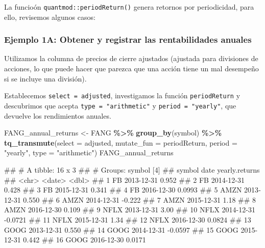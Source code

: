 \documentclass[
]{book}
\newenvironment{Shaded}{\begin{snugshade}}{\end{snugshade}}
\newcommand{\AttributeTok}[1]{\textcolor[rgb]{0.13,0.29,0.53}{#1}}
\newcommand{\FunctionTok}[1]{\textcolor[rgb]{0.13,0.29,0.53}{\textbf{#1}}}
\newcommand{\NormalTok}[1]{#1}
\newcommand{\OtherTok}[1]{\textcolor[rgb]{0.56,0.35,0.01}{#1}}
\newcommand{\SpecialCharTok}[1]{\textcolor[rgb]{0.81,0.36,0.00}{\textbf{#1}}}
\newcommand{\StringTok}[1]{\textcolor[rgb]{0.31,0.60,0.02}{#1}}
\begin{document}
La funcioón \texttt{quantmod::periodReturn()} genera retornos por periodicidad, para ello, revisemos algunos casos:

\hypertarget{ejemplo-1a-obtener-y-registrar-las-rentabilidades-anuales}{%
\subsubsection{Ejemplo 1A: Obtener y registrar las rentabilidades anuales}\label{ejemplo-1a-obtener-y-registrar-las-rentabilidades-anuales}}

Utilizamos la columna de precios de cierre ajustados (ajustada para divisiones de acciones, lo que puede hacer que parezca que una acción tiene un mal desempeño si se incluye una división).

Establecemos \texttt{select\ =\ adjusted}, investigamos la función \texttt{periodReturn} y descubrimos que acepta \texttt{type\ =\ "arithmetic"} y \texttt{period\ =\ "yearly"}, que devuelve los rendimientos anuales.

\begin{Shaded}
\begin{Highlighting}[]
\NormalTok{FANG\_annual\_returns }\OtherTok{\textless{}{-}}\NormalTok{ FANG }\SpecialCharTok{\%\textgreater{}\%}
    \FunctionTok{group\_by}\NormalTok{(symbol) }\SpecialCharTok{\%\textgreater{}\%}
    \FunctionTok{tq\_transmute}\NormalTok{(}\AttributeTok{select     =}\NormalTok{ adjusted, }
                 \AttributeTok{mutate\_fun =}\NormalTok{ periodReturn, }
                 \AttributeTok{period     =} \StringTok{"yearly"}\NormalTok{, }
                 \AttributeTok{type       =} \StringTok{"arithmetic"}\NormalTok{)}
\NormalTok{FANG\_annual\_returns}
\end{Highlighting}
\end{Shaded}

\begin{Shaded}
\begin{Highlighting}[]
\NormalTok{\#\# \# A tibble: 16 x 3}
\NormalTok{\#\# \# Groups:   symbol [4]}
\NormalTok{\#\#    symbol date       yearly.returns}
\NormalTok{\#\#    \textless{}chr\textgreater{}  \textless{}date\textgreater{}              \textless{}dbl\textgreater{}}
\NormalTok{\#\#  1 FB     2013{-}12{-}31         0.952 }
\NormalTok{\#\#  2 FB     2014{-}12{-}31         0.428 }
\NormalTok{\#\#  3 FB     2015{-}12{-}31         0.341 }
\NormalTok{\#\#  4 FB     2016{-}12{-}30         0.0993}
\NormalTok{\#\#  5 AMZN   2013{-}12{-}31         0.550 }
\NormalTok{\#\#  6 AMZN   2014{-}12{-}31        {-}0.222 }
\NormalTok{\#\#  7 AMZN   2015{-}12{-}31         1.18  }
\NormalTok{\#\#  8 AMZN   2016{-}12{-}30         0.109 }
\NormalTok{\#\#  9 NFLX   2013{-}12{-}31         3.00  }
\NormalTok{\#\# 10 NFLX   2014{-}12{-}31        {-}0.0721}
\NormalTok{\#\# 11 NFLX   2015{-}12{-}31         1.34  }
\NormalTok{\#\# 12 NFLX   2016{-}12{-}30         0.0824}
\NormalTok{\#\# 13 GOOG   2013{-}12{-}31         0.550 }
\NormalTok{\#\# 14 GOOG   2014{-}12{-}31        {-}0.0597}
\NormalTok{\#\# 15 GOOG   2015{-}12{-}31         0.442 }
\NormalTok{\#\# 16 GOOG   2016{-}12{-}30         0.0171}
\end{Highlighting}
\end{Shaded}
\end{document}
